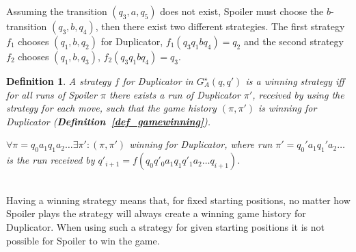 \documentclass[12pt,oneside,bibliography=totoc,abstracton]{scrartcl}
\newcommand{\defref}[1]{\textbf{Definition~\ref{#1}}}
\newtheorem{mydef}{Definition}
\begin{document}
Assuming the transition $(q_3, a, q_5)$ does not exist, Spoiler must choose the $b$-transition $(q_3, b, q_4)$,
then there exist two different strategies. The first strategy $f_1$ chooses $(q_1, b, q_2)$ for
Duplicator, $f_1(q_3q_1bq_4) = q_2$ and the second strategy $f_2$
chooses $(q_1, b, q_3)$, $f_2(q_3q_1bq_4) = q_3$.\\
\begin{mydef}
	A strategy $f$ for Duplicator in $G^{\star}_A(q, q')$ is a \textnormal{winning strategy} iff
	for all runs of Spoiler $\pi$ there exists a run of Duplicator $\pi'$, received by using the strategy for each move,
	such that the game history $(\pi, \pi')$ is winning for Duplicator \textnormal{(\defref{def_gamewinning})}.
	
	$\forall \pi = q_0a_1q_1a_2 \ldots \exists \pi' : (\pi, \pi')$
	winning for Duplicator, where run $\pi' = q_0'a_1q_1'a_2 \ldots$ is the run received by
	$q'_{i+1} = f(q_0q'_0a_1q_1q'_1a_2 \ldots q_{i+1})$.
\end{mydef}\quad\\
Having a winning strategy means that, for fixed starting positions, no matter how Spoiler plays the
strategy will always create a winning game history for Duplicator. When using such a strategy for given
starting positions it is not possible for Spoiler to win the game.
\end{document}
